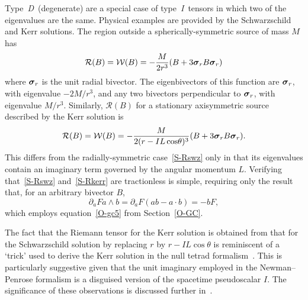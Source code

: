 \documentclass[a4paper]{article}
\numberwithin{equation}{section}
\newcommand{\dt}{\! \cdot \!}
\newcommand{\wdg}{\! \wedge \!}
\newcommand{\sig}{\mbox{\boldmath $\sigma$}}
\newcommand{\clr}{{\mathcal{R}}}
\newcommand{\clw}{{\mathcal{W}}}
\newcommand{\da}{\partial_a}
\newcommand{\slI}{\textsl{I}}
\newcommand{\slD}{\textsl{D}}
\begin{document}
Type~\slD\ (degenerate) are a special case of type~\slI\ tensors in
which two of the eigenvalues are the same.  Physical examples are
provided by the Schwarzschild and Kerr solutions.  The region outside
a spherically-symmetric source of mass $M$ has
%
\begin{equation}
\clr(B) = \clw(B) = - \frac{M}{2r^3} (B + 3 \sig_r B \sig_r)
\label{S-Rswz}
\end{equation}
%
where $\sig_r$ is the unit radial bivector.  The eigenbivectors of
this function are $\sig_r$, with eigenvalue $-2M/r^3$, and any two
bivectors perpendicular to $\sig_r$, with eigenvalue $M/r^3$.
Similarly, $\clr(B)$ for a stationary axisymmetric source described by
the Kerr solution is~\cite{gap,dor-thesis}
%
\begin{equation}
\clr(B) = \clw(B) = - \frac{M}{2(r-I L\cos\!\theta)^3} (B + 3 \sig_r B
\sig_r) .
\label{S-Rkerr}
\end{equation}
%
This differs from the radially-symmetric case~\eqref{S-Rswz} only in that
its eigenvalues contain an imaginary term governed by the angular
momentum $L$.  Verifying that~\eqref{S-Rswz} and~\eqref{S-Rkerr} are
tractionless is simple, requiring only the result that, for an
arbitrary bivector $B$,
%
\begin{equation}
\da F a \wdg b = \da F (ab - a \dt b) = - b F,
\end{equation}
%
which employs equation~\eqref{O-gc5} from Section~\ref{O-GC}.


The fact that the Riemann tensor for the Kerr solution is obtained
from that for the Schwarzschild solution by replacing $r$ by
$r-IL\cos\!\theta$ is reminiscent of a `trick' used to derive the Kerr
solution in the null tetrad formalism~\cite{new65}.  This is
particularly suggestive given that the unit imaginary employed in the
Newman--Penrose formalism is a disguised version of the spacetime
pseudoscalar $I$.  The significance of these observations is discussed
further in~\cite{DL04-KS,gap}.
\end{document}
